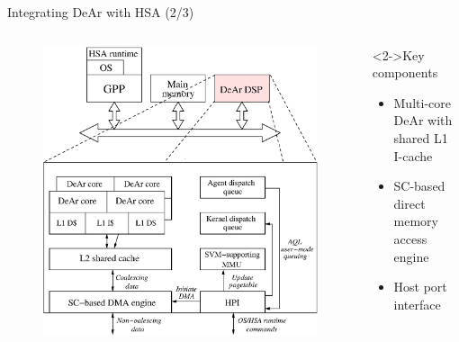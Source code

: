 \documentclass{beamer}
\begin{document}
\begin{CJK}{UTF8}{bkai}
            \begin{frame}{Integrating DeAr with HSA (2/3)}
                \begin{columns}
                    \begin{column}{0.6\textwidth}
                        \vspace{-1em}
                        \begin{figure}[!ht] 
                            \centering
                            \includegraphics[width=1.0\textwidth]{./figs/archi.eps}
                            \label{fig:archi}
                        \end{figure}
                    \end{column}
                    \begin{column}{0.40\textwidth}
                        \begin{block}<2->{Key components}
                            \begin{itemize}
                                \item <3->{Multi-core DeAr with shared L1 I-cache}
                                \item <4->{SC-based direct memory access engine}
                                \item <5->{Host port interface}
                            \end{itemize}
                        \end{block}
                    \end{column}
                \end{columns}
            \end{frame}


\end{CJK}
\end{document}
